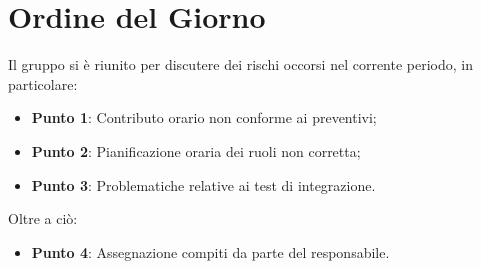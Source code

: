 \section{Ordine del Giorno}
Il gruppo si è riunito per discutere dei rischi occorsi nel corrente periodo, in particolare:
\begin{itemize}
	\item \textbf{Punto 1}: Contributo orario non conforme ai preventivi;
	\item \textbf{Punto 2}: Pianificazione oraria dei ruoli non corretta;
	\item \textbf{Punto 3}: Problematiche relative ai test di integrazione.
\end{itemize}
Oltre a ciò:
\begin{itemize}
	\item \textbf{Punto 4}: Assegnazione compiti da parte del responsabile.
\end{itemize}
